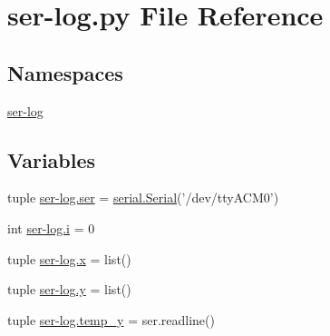 \hypertarget{ser-log_8py}{\section{ser-\/log.py File Reference}
\label{ser-log_8py}
}
\subsection*{Namespaces}
\begin{DoxyCompactItemize}
\item 
\hyperlink{namespaceser-log}{ser-\/log}
\end{DoxyCompactItemize}
\subsection*{Variables}
\begin{DoxyCompactItemize}
\item 
tuple \hyperlink{namespaceser-log_ae5e2c2855fe8c235874474c5277745ac}{ser-\/log.\-ser} = \hyperlink{HardwareSerial_8h_a7b8c4a195c58f9eb8750e94955c5aa4b}{serial.\-Serial}('/dev/tty\-A\-C\-M0')
\item 
int \hyperlink{namespaceser-log_a07a12eb5896dee0953b2f34bf4e3e0d8}{ser-\/log.\-i} = 0
\item 
tuple \hyperlink{namespaceser-log_ad4c918427408ee85c0def9ccf3a8cdaa}{ser-\/log.\-x} = list()
\item 
tuple \hyperlink{namespaceser-log_a6381ab980f595f0e94c91312cc3020c5}{ser-\/log.\-y} = list()
\item 
tuple \hyperlink{namespaceser-log_af746ba3a68039d15d0a46e905dc990d2}{ser-\/log.\-temp\-\_\-y} = ser.\-readline()
\end{DoxyCompactItemize}
